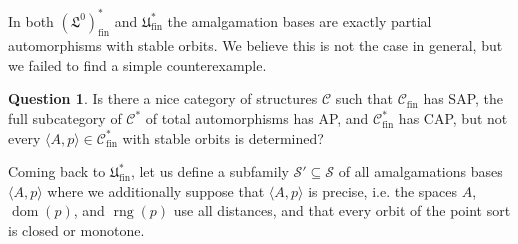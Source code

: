 \documentclass[10pt,a4paper]{article}
\theoremstyle{definition}
\newtheorem{question}[tw]{Question}
\theoremstyle{remark}
\newcommand \seq [1]{\langle #1 \rangle}
\newcommand \dom {\operatorname{dom}}
\newcommand \rng {\operatorname{rng}}
\newcommand \Su {\mathscr{S}}
\newcommand \C {\mathscr{C}}
\newcommand \fin {{\operatorname{fin}}}
\newcommand \Lin {\mathfrak{L}}
\newcommand \Ult {\mathfrak{U}}
\begin{document}
In both $(\Lin^0)^*_\fin$ and $\Ult^*_\fin$ the amalgamation bases are exactly partial automorphisms with stable orbits.
We believe this is not the case in general, but we failed to find a simple counterexample.
\begin{question} \label{que:stable_always_works}
    Is there a nice category of structures $\C$ such that $\C_\fin$ has SAP, the full subcategory of $\C^*$ of total automorphisms has AP, and $\C^*_\fin$ has CAP, but not every $\seq{A, p} \in \C^*_\fin$ with stable orbits is determined?
\end{question}

Coming back to $\Ult^*_\fin$,
let us define a subfamily $\Su' \subseteq \Su$ of all amalgamations bases $\seq{A, p}$ where we additionally suppose that $\seq{A, p}$ is precise, i.e. the spaces $A$, $\dom(p)$, and $\rng(p)$ use all distances, and that every orbit of the point sort is closed or monotone.
\end{document}
